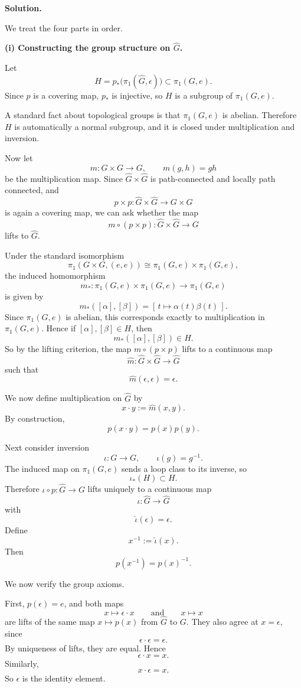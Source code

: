 \documentclass[12pt,a4paper]{article}
\theoremstyle{notespace}
\begin{document}
\textbf{Solution.}

We treat the four parts in order.

\medskip

\textbf{(i) Constructing the group structure on \(\widehat{G}\).}

Let
\[
H=p_*\bigl(\pi_1(\widehat{G},\epsilon)\bigr)\subset \pi_1(G,e).
\]
Since \(p\) is a covering map, \(p_*\) is injective, so \(H\) is a subgroup of \(\pi_1(G,e)\).

A standard fact about topological groups is that \(\pi_1(G,e)\) is abelian. Therefore \(H\) is automatically a normal subgroup, and it is closed under multiplication and inversion.

Now let
\[
m:G\times G\to G,
\qquad
m(g,h)=gh
\]
be the multiplication map. Since \(\widehat{G}\times \widehat{G}\) is path-connected and locally path connected, and
\[
p\times p:\widehat{G}\times \widehat{G}\to G\times G
\]
is again a covering map, we can ask whether the map
\[
m\circ (p\times p):\widehat{G}\times \widehat{G}\to G
\]
lifts to \(\widehat{G}\).

Under the standard isomorphism
\[
\pi_1(G\times G,(e,e))\cong \pi_1(G,e)\times \pi_1(G,e),
\]
the induced homomorphism
\[
m_*:\pi_1(G,e)\times \pi_1(G,e)\to \pi_1(G,e)
\]
is given by
\[
m_*([\alpha],[\beta])=[\,t\mapsto \alpha(t)\beta(t)\,].
\]
Since \(\pi_1(G,e)\) is abelian, this corresponds exactly to multiplication in \(\pi_1(G,e)\). Hence if \([\alpha],[\beta]\in H\), then
\[
m_*([\alpha],[\beta])\in H.
\]
So by the lifting criterion, the map \(m\circ (p\times p)\) lifts to a continuous map
\[
\widehat{m}:\widehat{G}\times \widehat{G}\to \widehat{G}
\]
such that
\[
\widehat{m}(\epsilon,\epsilon)=\epsilon.
\]

We now define multiplication on \(\widehat{G}\) by
\[
x\cdot y:=\widehat{m}(x,y).
\]
By construction,
\[
p(x\cdot y)=p(x)p(y).
\]

Next consider inversion
\[
\iota:G\to G,
\qquad
\iota(g)=g^{-1}.
\]
The induced map on \(\pi_1(G,e)\) sends a loop class to its inverse, so
\[
\iota_*(H)\subset H.
\]
Therefore \(\iota\circ p:\widehat{G}\to G\) lifts uniquely to a continuous map
\[
\widehat{\iota}:\widehat{G}\to \widehat{G}
\]
with
\[
\widehat{\iota}(\epsilon)=\epsilon.
\]
Define
\[
x^{-1}:=\widehat{\iota}(x).
\]
Then
\[
p(x^{-1})=p(x)^{-1}.
\]

We now verify the group axioms.

First, \(p(\epsilon)=e\), and both maps
\[
x\mapsto \epsilon\cdot x
\qquad\text{and}\qquad
x\mapsto x
\]
are lifts of the same map \(x\mapsto p(x)\) from \(\widehat{G}\) to \(G\). They also agree at \(x=\epsilon\), since
\[
\epsilon\cdot \epsilon=\epsilon.
\]
By uniqueness of lifts, they are equal. Hence
\[
\epsilon\cdot x=x.
\]
Similarly,
\[
x\cdot \epsilon=x.
\]
So \(\epsilon\) is the identity element.
\end{document}
